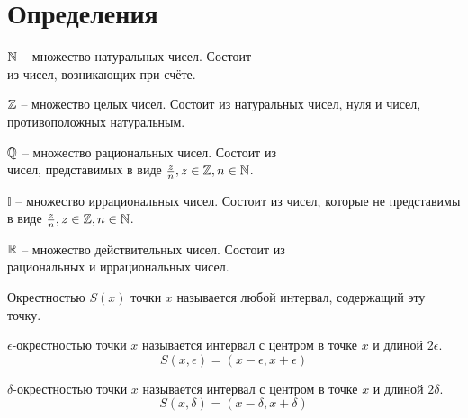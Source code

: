\section{Определения}

\begin{definition}
    $\mathbb{N}$ -- множество натуральных чисел.
    Состоит \\ из чисел, возникающих при счёте. 
\end{definition}

\begin{definition}
    $\mathbb{Z}$ -- множество целых чисел.
    Состоит из натуральных чисел, нуля и чисел, противоположных натуральным.
\end{definition}

\begin{definition}
    $\mathbb{Q}$ -- множество рациональных чисел. 
    Состоит из \\ чисел, представимых в виде $\frac{z}{n}, z \in \mathbb{Z}, n \in \mathbb{N}$.
\end{definition}

\begin{definition}
    $\mathbb{I}$ -- множество иррациональных чисел.
    Состоит из чисел, которые не представимы в виде $\frac{z}{n}, z \in \mathbb{Z}, n \in \mathbb{N}$. 
\end{definition}

\begin{definition}
    $\mathbb{R}$ -- множество действительных чисел.
    Состоит из \\ рациональных и иррациональных чисел.
\end{definition}

\begin{definition}
    Окрестностью $S(x)$ точки $x$ называется любой интервал, содержащий эту точку. 
\end{definition}

\begin{definition}
    $\epsilon$-окрестностью точки $x$ называется интервал с центром в точке $x$ и длиной $2 \epsilon$. \[
        S(x, \epsilon) = (x-\epsilon, x+\epsilon)
    \]
\end{definition}

\begin{definition}
    $\delta$-окрестностью точки $x$ называется интервал с центром в точке $x$ и длиной $2 \delta$.  \[
        S(x, \delta) = (x-\delta, x+\delta)
    \]
\end{definition}

